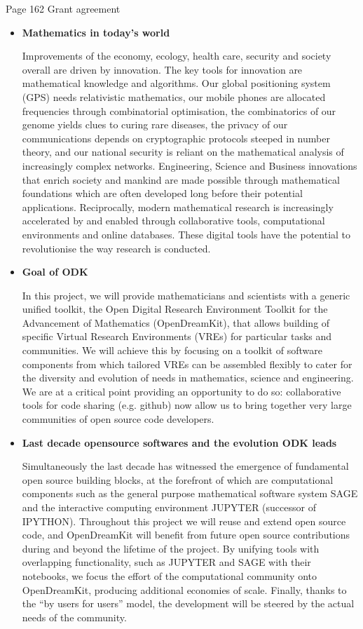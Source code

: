 \documentclass[12pta4wide]{amsart}
\begin{document}
Page 162 Grant agreement
\begin{itemize}

\item{\textbf{Mathematics in today's world}}

Improvements of the economy, ecology, health care, security and society overall are driven by innovation. The key tools for
innovation are mathematical knowledge and algorithms. Our global positioning system (GPS) needs relativistic mathematics,
our mobile phones are allocated frequencies through combinatorial optimisation, the combinatorics of our genome yields clues
to curing rare diseases, the privacy of our communications depends on cryptographic protocols steeped in number theory,
and our national security is reliant on the mathematical analysis of increasingly complex networks. Engineering, Science and
Business innovations that enrich society and mankind are made possible through mathematical foundations which are often
developed long before their potential applications. Reciprocally, modern mathematical research is increasingly accelerated
by and enabled through collaborative tools, computational environments and online databases. These digital tools have the
potential to revolutionise the way research is conducted.

\item{\textbf{Goal of ODK}}

In this project, we will provide mathematicians and scientists with a generic unified toolkit, the Open Digital Research
Environment Toolkit for the Advancement of Mathematics (OpenDreamKit), that allows building of specific Virtual Research
Environments (VREs) for particular tasks and communities.
We will achieve this by focusing on a toolkit of software components from which tailored VREs can be assembled flexibly to
cater for the diversity and evolution of needs in mathematics, science and engineering. We are at a critical point providing an
opportunity to do so: collaborative tools for code sharing (e.g. github) now allow us to bring together very large communities
of open source code developers.

\item{\textbf{Last decade opensource softwares and the evolution ODK leads}}

Simultaneously the last decade has witnessed the emergence of fundamental open source building blocks, at the forefront
of which are computational components such as the general purpose mathematical software system SAGE and the interactive
computing environment JUPYTER (successor of IPYTHON). Throughout this project we will reuse and extend open source
code, and OpenDreamKit will benefit from future open source contributions during and beyond the lifetime of the project.
By unifying tools with overlapping functionality, such as JUPYTER and SAGE with their notebooks, we focus the effort of the
computational community onto OpenDreamKit, producing additional economies of scale. Finally, thanks to the “by users for
users” model, the development will be steered by the actual needs of the community.


\end{itemize}
\end{document}
